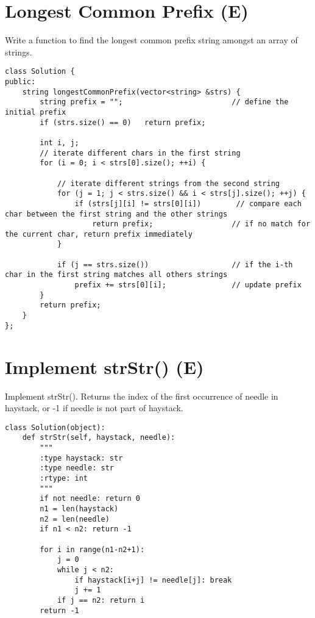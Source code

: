 \section{Longest Common Prefix (E)}
Write a function to find the longest common prefix string amongst an array of strings. \\

\begin{lstlisting}
class Solution {
public:
    string longestCommonPrefix(vector<string> &strs) {
        string prefix = "";                         // define the initial prefix
        if (strs.size() == 0)   return prefix;
        
        int i, j;
        // iterate different chars in the first string
        for (i = 0; i < strs[0].size(); ++i) { 
            
            // iterate different strings from the second string
            for (j = 1; j < strs.size() && i < strs[j].size(); ++j) {     
                if (strs[j][i] != strs[0][i])        // compare each char between the first string and the other strings
                    return prefix;                  // if no match for the current char, return prefix immediately
            }
            
            if (j == strs.size())                   // if the i-th char in the first string matches all others strings
                prefix += strs[0][i];               // update prefix
        }
        return prefix;
    }
};
\end{lstlisting}


\section{Implement strStr() (E)}
Implement strStr(). Returns the index of the first occurrence of needle in haystack, or -1 if needle is not part of haystack. \\

\begin{lstlisting}
class Solution(object):
    def strStr(self, haystack, needle):
        """
        :type haystack: str
        :type needle: str
        :rtype: int
        """
        if not needle: return 0
        n1 = len(haystack)
        n2 = len(needle)
        if n1 < n2: return -1
        
        for i in range(n1-n2+1):
            j = 0
            while j < n2:
                if haystack[i+j] != needle[j]: break
                j += 1
            if j == n2: return i
        return -1
\end{lstlisting}

